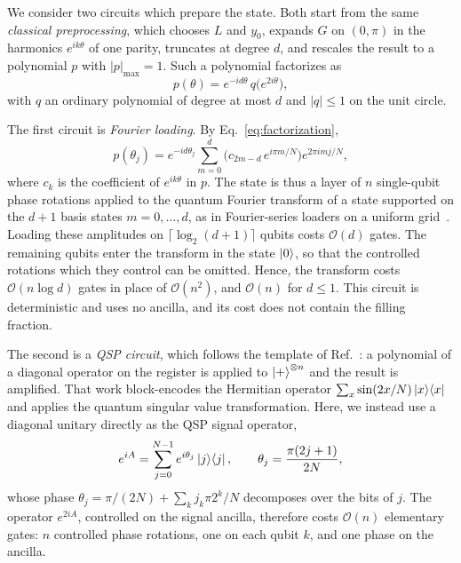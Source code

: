 We consider two circuits which prepare the state.  Both start from
the same \emph{classical preprocessing}, which chooses $L$ and
$y_0$, expands
$G$ on $(0,\pi)$ in the harmonics $e^{ik\theta}$ of one parity,
truncates at degree $d$, and rescales the result to a polynomial
$p$ with $|p|_{\max}=1$.  Such a polynomial factorizes as
\begin{equation}
	p(\theta)=e^{-id\theta}\,q\bigl(e^{2i\theta}\bigr),
	\label{eq:factorization}
\end{equation}
with $q$ an ordinary polynomial of degree at most $d$ and
$|q|\le1$ on the unit circle.

The first circuit is \emph{Fourier loading}.  By
Eq.~\eqref{eq:factorization},
\begin{equation}
	p(\theta_j)=e^{-id\theta_j}\sum_{m=0}^{d}
	\bigl(c_{2m-d}\,e^{i\pi m/N}\bigr)e^{2\pi imj/N},
	\label{eq:fourier-loading}
\end{equation}
where $c_k$ is the coefficient of $e^{ik\theta}$ in $p$.  The state
is thus a layer of $n$ single-qubit phase rotations applied to the
quantum Fourier transform of a state supported on the $d+1$ basis
states $m=0,\dots,d$, as in Fourier-series loaders on a uniform
grid~\cite{MoosaEtAl2023}.  Loading these amplitudes on
$\lceil\log_2(d+1)\rceil$ qubits costs $\mathcal{O}(d)$ gates.
The remaining qubits enter the transform in the state $\ket{0}$,
so that the controlled rotations which they control can be
omitted.  Hence, the transform costs $\mathcal{O}(n\log d)$ gates
in place of $\mathcal{O}(n^2)$, and $\mathcal{O}(n)$ for $d\le1$.
This circuit is deterministic and uses no ancilla, and its cost
does not contain the filling fraction.

The second is a \emph{QSP circuit}, which follows the template of
Ref.~\cite{McArdleGilyenBerta2025}: a polynomial of a diagonal
operator on the register is applied to $\ket{+}^{\otimes n}$ and the
result is amplified.  That work block-encodes the Hermitian operator
$\sum_x\sin(2x/N)\ket{x}\!\bra{x}$ and applies the quantum singular
value transformation.  Here, we instead use a diagonal unitary
directly as the QSP signal operator,
\begin{equation}
	e^{iA}=\sum_{j=0}^{N-1}e^{i\theta_j}\ket{j}\!\bra{j},\qquad
	\theta_j=\frac{\pi(2j+1)}{2N},
	\label{eq:qet-signal}
\end{equation}
whose phase $\theta_j=\pi/(2N)+\sum_{k}j_k\pi 2^k/N$ decomposes over
the bits of $j$.  The operator $e^{2iA}$, controlled on the signal
ancilla, therefore costs $\mathcal{O}(n)$ elementary gates: $n$
controlled phase rotations, one on each qubit $k$, and one phase on
the ancilla.

